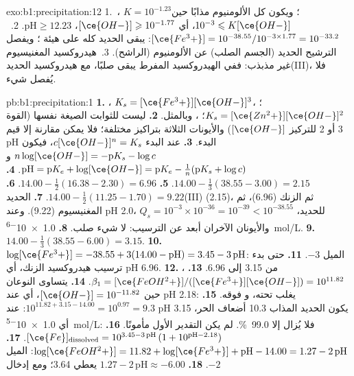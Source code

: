 \begin{solution}{exo:b1:precipitation:12}
1.~، $K = 10^{-1.23}$؛ ويكون كل
الألومنيوم مذابًا حين $10^{-3} \leqslant K[\ce{OH-}]$، أي
$[\ce{OH-}] \geqslant 10^{-1.77}$، $\mathrm{pH} \geqslant 12.23$.
2.~$[\ce{Fe^3+}] = 10^{-38.55}/10^{-3 \times 1.77} = 10^{-33.2}$: يبقى الحديد
كله على هيئة ؛ ويفصل الترشيح الحديد (الجسم الصلب)
عن الألومنيوم (الراشح).
3.~هيدروكسيد المغنيسيوم غير مذبذب: ففي الهيدروكسيد المفرط يبقى
صلبًا، مع هيدروكسيد الحديد(III)، فلا يُفصل شيء.
\end{solution}

\begin{solution}{pb:b1:precipitation:1}
\textbf{1.} ، $K_s = [\ce{Fe^3+}][\ce{OH-}]^3$؛
، $K_s = [\ce{Zn^2+}][\ce{OH-}]^2$؛
، وبالمثل.
\textbf{2.} ليست للثوابت الصيغة نفسها (القوة 3 أو 2 للتركيز
$[\ce{OH-}]$) والأيونات الثلاثة بتراكيز مختلفة؛ فلا يمكن مقارنة إلا
قيم pH البدء.
\textbf{3.} عند البدء $c[\ce{OH-}]^n = K_s$، فيكون $n\log[\ce{OH-}] =
-\mathrm{p}K_s - \log c$ و$\mathrm{pH} = \mathrm{p}K_e +
\log[\ce{OH-}] = \mathrm{p}K_e - \frac1n(\mathrm{p}K_s + \log c)$.
\textbf{4.} $14.00 - \frac13(38.55 - 3.00) = 2.15$.
\textbf{5.} $14.00 - \frac12(16.38 - 2.30) = 6.96$.
\textbf{6.} $14.00 - \frac12(11.25 - 1.70) = 9.22$.
\textbf{7.} الحديد(III) (2.15)، ثم الزنك (6.96)، ثم المغنيسيوم (9.22). وعند
pH 2.0، $Q_s = 10^{-3} \times 10^{-36} = 10^{-39} < 10^{-38.55}$ للحديد،
والأيونان الآخران أبعد عن الترسيب: لا شيء صلب.
\textbf{8.} \qty{1.0e-6}{mol/L}.
\textbf{9.} $14.00 - \frac13(38.55 - 6.00) = 3.15$.
\textbf{10.} $\log[\ce{Fe^3+}] = -38.55 + 3(14.00 - \mathrm{pH}) = 3.45 -
3\,\mathrm{pH}$: الميل $-3$.
\textbf{11.} حتى بدء ترسيب هيدروكسيد الزنك، أي pH 6.96.
\textbf{12.} من 3.15 إلى 6.96.
\textbf{13.} ، $\beta_1 =
[\ce{FeOH^2+}]/([\ce{Fe^3+}][\ce{OH-}]) = 10^{11.82}$.
\textbf{14.} يتساوى النوعان حين $[\ce{OH-}] = 10^{-11.82}$، أي عند pH 2.18:
يغلب  تحته، و فوقه.
\textbf{15.} $10^{11.82 + 3.15 - 14.00} = 10^{0.97} = 9.3$: عند pH 3.15 يكون
الحديد المذاب 10.3 أضعاف  الحر، أي \qty{1.0e-5}{mol/L}:
فلا يُزال إلا \qty{99.0}{\percent}. لم يكن التقدير الأول مأمونًا.
\textbf{16.} $[\ce{Fe}]_{\mathrm{dissolved}} = 10^{3.45 - 3\,\mathrm{pH}}\,
(1 + 10^{\mathrm{pH} - 2.18})$.
\textbf{17.} $\log[\ce{FeOH^2+}] = 11.82 + \log[\ce{Fe^3+}] + \mathrm{pH} -
14.00 = 1.27 - 2\,\mathrm{pH}$: الميل $-2$.
\textbf{18.} $1.27 - 2\,\mathrm{pH} \approx -6.00$ يعطي 3.64؛ ومع إدخال

\end{solution}
